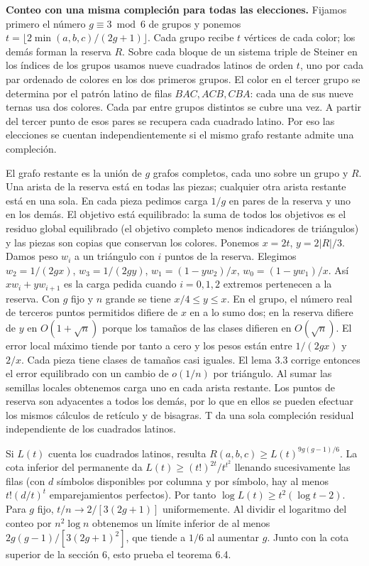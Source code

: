 \documentclass[spanish,11pt,a4paper]{article}
\begin{document}
\textbf{Conteo con una misma compleción para todas las elecciones.} Fijamos primero el número \(g\equiv3\bmod6\) de grupos y ponemos \(t=\lfloor2\min(a,b,c)/(2g+1)\rfloor\). Cada grupo recibe \(t\) vértices de cada color; los demás forman la reserva \(R\). Sobre cada bloque de un sistema triple de Steiner en los índices de los grupos usamos nueve cuadrados latinos de orden \(t\), uno por cada par ordenado de colores en los dos primeros grupos. El color en el tercer grupo se determina por el patrón latino de filas \(BAC,ACB,CBA\): cada una de sus nueve ternas usa dos colores. Cada par entre grupos distintos se cubre una vez. A partir del tercer punto de esos pares se recupera cada cuadrado latino. Por eso las elecciones se cuentan independientemente si el mismo grafo restante admite una compleción.

El grafo restante es la unión de \(g\) grafos completos, cada uno sobre un grupo y \(R\). Una arista de la reserva está en todas las piezas; cualquier otra arista restante está en una sola. En cada pieza pedimos carga \(1/g\) en pares de la reserva y uno en los demás. El objetivo está equilibrado: la suma de todos los objetivos es el residuo global equilibrado (el objetivo completo menos indicadores de triángulos) y las piezas son copias que conservan los colores. Ponemos \(x=2t\), \(y=2|R|/3\). Damos peso \(w_i\) a un triángulo con \(i\) puntos de la reserva. Elegimos \(w_2=1/(2gx)\), \(w_3=1/(2gy)\), \(w_1=(1-yw_2)/x\), \(w_0=(1-yw_1)/x\). Así \(xw_i+yw_{i+1}\) es la carga pedida cuando \(i=0,1,2\) extremos pertenecen a la reserva. Con \(g\) fijo y \(n\) grande se tiene \(x/4\le y\le x\). En el grupo, el número real de terceros puntos permitidos difiere de \(x\) en a lo sumo dos; en la reserva difiere de \(y\) en \(O(1+\sqrt n)\) porque los tamaños de las clases difieren en \(O(\sqrt n)\). El error local máximo tiende por tanto a cero y los pesos están entre \(1/(2gx)\) y \(2/x\). Cada pieza tiene clases de tamaños casi iguales. El lema 3.3 corrige entonces el error equilibrado con un cambio de \(o(1/n)\) por triángulo. Al sumar las semillas locales obtenemos carga uno en cada arista restante. Los puntos de reserva son adyacentes a todos los demás, por lo que en ellos se pueden efectuar los mismos cálculos de retículo y de bisagras. T da una sola compleción residual independiente de los cuadrados latinos.

Si \(L(t)\) cuenta los cuadrados latinos, resulta \(R(a,b,c)\ge L(t)^{9g(g-1)/6}\). La cota inferior del permanente da \(L(t)\ge (t!)^{2t}/t^{t^2}\) llenando sucesivamente las filas (con \(d\) símbolos disponibles por columna y por símbolo, hay al menos \(t!(d/t)^t\) emparejamientos perfectos). Por tanto \(\log L(t)\ge t^2(\log t-2)\). Para \(g\) fijo, \(t/n\to 2/[3(2g+1)]\) uniformemente. Al dividir el logaritmo del conteo por \(n^2\log n\) obtenemos un límite inferior de al menos \(2g(g-1)/[3(2g+1)^2]\), que tiende a \(1/6\) al aumentar \(g\). Junto con la cota superior de la sección 6, esto prueba el teorema 6.4.
\end{document}
